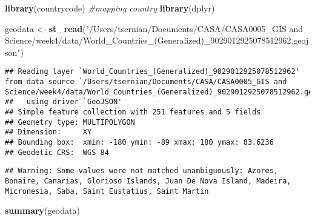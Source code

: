 \documentclass[
]{article}
\newenvironment{Shaded}{\begin{snugshade}}{\end{snugshade}}
\newcommand{\CommentTok}[1]{\textcolor[rgb]{0.56,0.35,0.01}{\textit{#1}}}
\newcommand{\FunctionTok}[1]{\textcolor[rgb]{0.13,0.29,0.53}{\textbf{#1}}}
\newcommand{\NormalTok}[1]{#1}
\newcommand{\OtherTok}[1]{\textcolor[rgb]{0.56,0.35,0.01}{#1}}
\newcommand{\SpecialCharTok}[1]{\textcolor[rgb]{0.81,0.36,0.00}{\textbf{#1}}}
\newcommand{\StringTok}[1]{\textcolor[rgb]{0.31,0.60,0.02}{#1}}
\begin{document}
\begin{Shaded}
\begin{Highlighting}[]
\FunctionTok{library}\NormalTok{(countrycode) }\CommentTok{\#mapping country}
\FunctionTok{library}\NormalTok{(dplyr)}
\end{Highlighting}
\end{Shaded}

\begin{Shaded}
\begin{Highlighting}[]
\NormalTok{geodata }\OtherTok{\textless{}{-}} \FunctionTok{st\_read}\NormalTok{(}\StringTok{"/Users/tsernian/Documents/CASA/CASA0005\_GIS and Science/week4/data/World\_Countries\_(Generalized)\_9029012925078512962.geojson"}\NormalTok{)}
\end{Highlighting}
\end{Shaded}

\begin{verbatim}
## Reading layer `World_Countries_(Generalized)_9029012925078512962' from data source `/Users/tsernian/Documents/CASA/CASA0005_GIS and Science/week4/data/World_Countries_(Generalized)_9029012925078512962.geojson' 
##   using driver `GeoJSON'
## Simple feature collection with 251 features and 5 fields
## Geometry type: MULTIPOLYGON
## Dimension:     XY
## Bounding box:  xmin: -180 ymin: -89 xmax: 180 ymax: 83.6236
## Geodetic CRS:  WGS 84
\end{verbatim}

\begin{Shaded}
\end{Shaded}

\begin{verbatim}
## Warning: Some values were not matched unambiguously: Azores, Bonaire, Canarias, Glorioso Islands, Juan De Nova Island, Madeira, Micronesia, Saba, Saint Eustatius, Saint Martin
\end{verbatim}

\begin{Shaded}
\begin{Highlighting}[]
\FunctionTok{summary}\NormalTok{(geodata)}
\end{Highlighting}
\end{Shaded}
\end{document}
